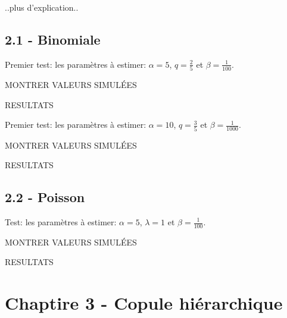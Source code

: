 \documentclass{article}
\begin{document}
	..plus d'explication..
	
	\subsection{2.1 - Binomiale}
	Premier test: les paramètres à estimer: $\alpha = 5$, $q = \frac{2}{5}$ et $\beta = \frac{1}{100}$.
	
	MONTRER VALEURS SIMULÉES
	
	RESULTATS
	
	
	Premier test: les paramètres à estimer: $\alpha = 10$, $q = \frac{3}{5}$ et $\beta = \frac{1}{1000}$.
	
	MONTRER VALEURS SIMULÉES
	
	RESULTATS
	\subsection{2.2 - Poisson}
	
	Test: les paramètres à estimer: $\alpha = 5$, $\lambda = 1$ et $\beta = \frac{1}{100}$.
	
	MONTRER VALEURS SIMULÉES
	
	RESULTATS
	
	\section{Chaptire 3 - Copule hiérarchique}	
\end{document}
